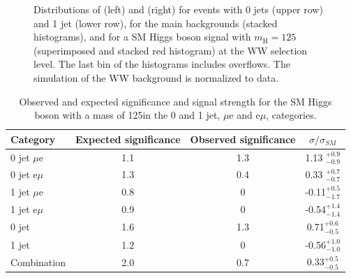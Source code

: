 \begin{figure}
{}
\caption{Distributions of \mll (left) and \mt (right) for events with 0 jets (upper row) and 1 jet (lower row), for the main backgrounds (stacked histograms), and for a SM Higgs boson signal with $m_\mathrm{H}=125$\GeV (superimposed and stacked red histogram) at the WW selection level. The last bin of the histograms includes overflows. The simulation of the WW background is normalized to data.}\label{fig:mllandmt}
\end{figure}

\begin{table}[!htb]
\caption{Observed and expected significance and signal strength for the SM Higgs boson with a mass of 125\GeV in the 0 and 1 jet, $\mu$e and e$\mu$, categories.}\label{tab:13TeVsignif}
\begin{center}
\begin{tabular}{lccc}
\toprule
Category  &  Expected significance      &  Observed  significance    &  $\sigma/\sigma_{SM}$     \\
\midrule
0 jet  $\mu$e   &     1.1        &  1.3        &  1.13 $_{-0.9}^{+0.9}$             \\ [5pt]   

0 jet  e$\mu$   &     1.3        &  0.4        &  0.33 $_{-0.7}^{+0.7}$             \\ [5pt]   

1 jet  $\mu$e   &     0.8        &  0          &  -0.11$_{-1.7}^{+0.5}$                 \\ [5pt] 

1 jet  e$\mu$   &     0.9        &  0          &  -0.54$_{-1.4}^{+1.4}$                 \\ [5pt] 

\midrule 

0 jet           &     1.6        &  1.3       &  0.71$_{-0.5}^{+0.6}$             \\ [5pt]  

1 jet           &     1.2        &  0         &  -0.56$_{-1.0}^{+1.0}$                \\ [5pt]  

\midrule 
Combination     &     2.0        &  0.7       &  0.33$_{-0.5}^{+0.5}$              \\ [5pt]  
\bottomrule
\end{tabular}
\end{center}
\end{table}

